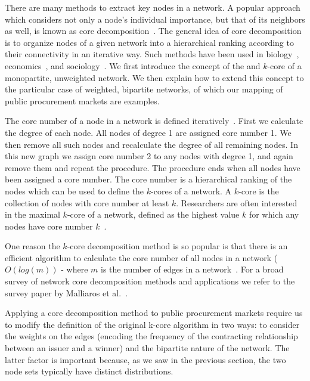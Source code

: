 There are many methods to extract key nodes in a network. A popular approach which considers not only a node's individual importance, but that of its neighbors as well, is known as core decomposition~\cite{batagelj2002generalized,csermely2013structure}. The general idea of core decomposition is to organize nodes of a given network into a hierarchical ranking according to their connectivity in an iterative way. Such methods have been used in biology~\cite{wuchty2005peeling}, economics~\cite{garas2012k}, and sociology~\cite{ugander2012structural}. We first introduce the concept of the and $k$-core of a monopartite, unweighted network. We then explain how to extend this concept to the particular case of weighted, bipartite networks, of which our mapping of public procurement markets are examples.


The core number of a node in a network is defined iteratively~\cite{batagelj2002generalized}. First we calculate the degree of each node. All nodes of degree 1 are assigned core number 1. We then remove all such nodes and recalculate the degree of all remaining nodes. In this new graph we assign core number 2 to any nodes with degree 1, and again remove them and repeat the procedure. The procedure ends when all nodes have been assigned a core number. The core number is a hierarchical ranking of the nodes which can be used to define the $k$-cores of a network. A $k$-core is the collection of nodes with core number at least $k$. Researchers are often interested in the maximal $k$-core of a network, defined as the highest value $k$ for which any nodes have core number $k$~\cite{alvarez2006large}.

One reason the $k$-core decomposition method is so popular is that there is an efficient algorithm to calculate the core number of all nodes in a network ($O(log(m))$ - where $m$ is the number of edges in a network~\cite{batagelj2003m}. For a broad survey of network core decomposition methods and applications we refer to the survey paper by Malliaros et al.~\cite{malliaros2019core}.

Applying a core decomposition method to public procurement markets require us to modify the definition of the original k-core algorithm in two ways: to consider the weights on the edges (encoding the frequency of the contracting relationship between an issuer and a winner) and the bipartite nature of the network. The latter factor is important because, as we saw in the previous section, the two node sets typically have distinct distributions. 

